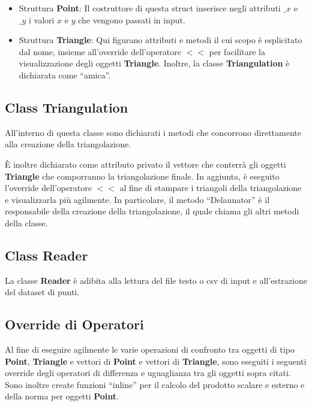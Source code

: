 \documentclass{article}
\begin{document}
\begin{itemize}

\item  Struttura \textbf{Point}: Il costruttore di questa struct inserisce negli attributi $\_x$ e $\_y$ i valori $x$ e $y$ che vengono passati in input.\\

\item Struttura \textbf{Triangle}: Qui figurano attributi e metodi il cui scopo è esplicitato dal nome,  insieme all'override dell'operatore $<<$ per facilitare la visualizzazione degli oggetti \textbf{Triangle}.  Inoltre,  la classe \textbf{Triangulation} è dichiarata come \enquote{amica}.
\end{itemize}

\subsection{Class Triangulation}
All'interno di questa classe sono dichiarati i metodi che concorrono direttamente alla creazione della triangolazione.

È inoltre dichiarato come attributo privato il vettore che conterrà gli oggetti \textbf{Triangle} che comporranno la triangolazione finale.
In aggiunta,  è eseguito l'override dell'operatore $<<$ al fine di stampare i triangoli della triangolazione e visualizzarla più agilmente. 
In particolare,  il metodo \enquote{Delaunator} è il responsabile della creazione della triangolazione,  il quale chiama gli altri metodi della classe.

\subsection{Class Reader}
La classe \textbf{Reader} è adibita alla lettura del file testo o csv di input e all'estrazione del dataset di punti.

\subsection{Override di Operatori}
Al fine di eseguire agilmente le varie operazioni di confronto tra oggetti di tipo \textbf{Point}, \textbf{Triangle} e vettori di \textbf{Point} e vettori di \textbf{Triangle},  sono eseguiti i seguenti override degli operatori di differenza e uguaglianza tra gli oggetti sopra citati.  Sono inoltre create funzioni \enquote{inline} per il calcolo del prodotto scalare e esterno e della norma per oggetti \textbf{Point}.
\end{document}

